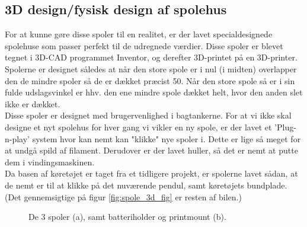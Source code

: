 \subsection{3D design/fysisk design af spolehus}\label{sec:3D_design}
For at kunne gøre disse spoler til en realitet, er der lavet specialdesignede spolehuse som passer perfekt til de udregnede værdier. Disse spoler er blevet tegnet i 3D-CAD programmet Inventor, og derefter 3D-printet på en 3D-printer. \\

Spolerne er designet således at når den store spole er i nul (i midten) overlapper den de mindre spoler så de er dækket præcist 50\percent. Når den store spole så er i sin fulde udslagsvinkel er hhv. den ene mindre spole dækket helt, hvor den anden slet ikke er dækket. \\

Disse spoler er designet med brugervenlighed i bagtankerne. For at vi ikke skal designe et nyt spolehus for hver gang vi vikler en ny spole, er der lavet et 'Plug-n-play' system hvor kan nemt kan "klikke" nye spoler i. Dette er lige så meget for at undgå spild af filament. Derudover er der lavet huller, så det er nemt at putte dem i vindingsmaskinen. \\

Da basen af køretøjet er taget fra et tidligere projekt, er spolerne lavet sådan, at de nemt er til at klikke på det nuværende pendul, samt køretøjets bundplade. (Det gennemsigtige på figur \ref{fig:spole_3d_fig} er resten af bilen.)

\begin{figure}[h!]
	\centering
	\caption{De 3 spoler (a), samt batteriholder og printmount (b).}
\end{figure}

